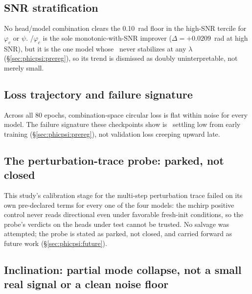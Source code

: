 \subsection{SNR stratification}
\label{sec:phicpsi:snr}

No head/model combination clears the 0.10~rad floor in the high-SNR tercile for $\varphi_c$ or $\psi$.
\Tcn/$\varphi_c$ is the sole monotonic-with-SNR improver ($\Delta=+0.0209$~rad at high SNR), but it is the one model whose \stdratio\ never stabilizes at any $\lambda$ (\S\ref{sec:phicpsi:prereg}), so its trend is dismissed as doubly uninterpretable, not merely small.

\subsection{Loss trajectory and failure signature}

Across all 80 epochs, combination-space circular loss is flat within noise for every model.
The failure signature these checkpoints show is \stdratio\ settling low from early training (\S\ref{sec:phicpsi:prereg}), not validation loss creeping upward late.

\subsection{The perturbation-trace probe: parked, not closed}

This study's calibration stage for the multi-step perturbation trace failed on its own pre-declared terms for every one of the four models: the mchirp positive control never reads directional even under favorable fresh-init conditions, so the probe's verdicts on the heads under test cannot be trusted.
No salvage was attempted; the probe is stated as parked, not closed, and carried forward as future work (\S\ref{sec:phicpsi:future}).

\subsection{Inclination: partial mode collapse, not a small real signal or a clean noise floor}
\label{sec:phicpsi:inclination}

